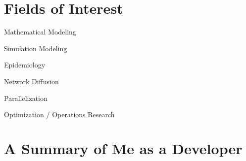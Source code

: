 \documentclass[10pt,letterpaper]{article}
\renewenvironment{itemize}{
  \begin{list}{}{
    \setlength{\leftmargin}{1.5em}
    \setlength{\itemsep}{0.25em}
    \setlength{\parskip}{0pt}
    \setlength{\parsep}{0.25em}
  }
}{
  \end{list}
}
\begin{document}

\section*{Fields of Interest}
\begin{itemize}
  \item Mathematical Modeling
  \item Simulation Modeling
  \item Epidemiology
  \item Network Diffusion
  \item Parallelization
  \item Optimization / Operations Research
\end{itemize}

\newpage

\section*{A Summary of Me as a Developer}
\end{document}
